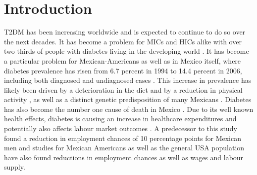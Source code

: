 \documentclass[12pt,english,british]{article}
\begin{document}
\section{\label{sec:Introduction}Introduction}

\ac{T2DM} has been increasing worldwide and is expected to continue to do so over the next decades. It has become a problem for \ac{MICs} and \ac{HICs} alike with over two-thirds of people with diabetes living in the developing world \citep{InternationalDiabetesFederation2013}. It has become a particular problem for Mexican-Americans as well as in Mexico itself, where diabetes prevalence has risen from 6.7 percent in 1994 to 14.4 percent in 2006, including both diagnosed and undiagnosed cases \citep{Barquera2013}. This increase in prevalence has likely been driven by a deterioration in the diet and by a reduction in physical activity \citep{Barquera2008b,Basu2013}, as well as a distinct genetic predisposition of many Mexicans \citep{Williams2013}. Diabetes has also become the number one cause of death in Mexico \cite{23374611}. Due to its well known health effects, diabetes is causing an increase in healthcare expenditures and potentially also affects labour market outcomes \citep{Seuring2015a}. A predecessor to this study found a reduction in employment chances of 10 percentage points for Mexican men and studies for Mexican Americans as well as the general \ac{USA} population have also found reductions in employment chances as well as wages and labour supply. 
\end{document}
